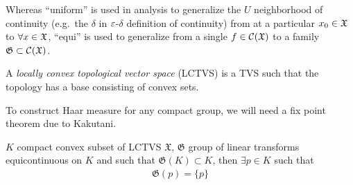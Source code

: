 \begin{remark}
  Whereas ``uniform'' is used in analysis to generalize the $U$ neighborhood of
  continuity (e.g.\ the $\delta$ in $\varepsilon$-$\delta$ definition of continuity)
  from at a particular $x_0 \in \mathfrak{X}$ to $\forall x \in \mathfrak{X}$, ``equi'' is used
  to generalize from a single $f \in \mathcal{C}(\mathfrak{X})$ to a family $\mathfrak{G} \subset
  \mathcal{C}(\mathfrak{X})$.
\end{remark}

\begin{definition}[In-Class]
  A \emph{locally convex topological vector space} (LCTVS) is a TVS
  such that the topology has a base consisting of convex sets.
\end{definition}

To construct Haar measure for any compact group, we will need a fix point
theorem due to Kakutani.

\begin{theorem}
  \label{thm:kakutani}
  $K$ compact convex subset of LCTVS $\mathfrak{X}$,
  $\mathfrak{G}$ group of linear transforms equicontinuous on $K$
  and such that $\mathfrak{G}(K) \subset K$,
  then $\exists p \in K$ such that
  \begin{align}
    \mathfrak{G}(p) = \{p\}
  \end{align}
\end{theorem}

